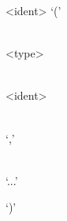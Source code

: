 \documentclass{article}
\def\H{Haskell}
\def\pend{\mbox{} \\\\}
\begin{document}
\begin{syntdiag}
<ident> ‘(’
\begin{rep} \begin{stack} \\
<type> \begin{stack} \\ <ident> \end{stack}
\end{stack} \\ ‘,’ \end{rep}
\begin{stack} \\ ‘...’ \end{stack} ‘)’
\end{syntdiag}


%


%


\end{document}
